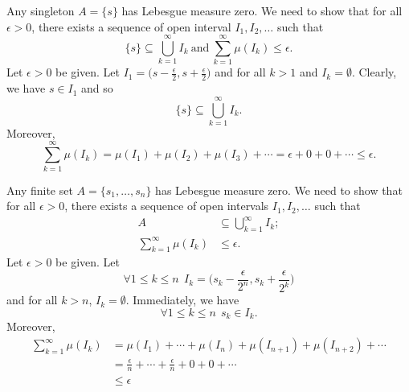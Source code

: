 \begin{eg}
    Any singleton \( A = \{ s  \}   \) has Lebesgue measure zero. We need to show that for all \( \epsilon > 0  \), there exists a sequence of open interval \( {I}_{1}, {I}_{2}, \dots  \) such that  
    \[  \{ s  \}  \subseteq  \bigcup_{ k=1  }^{ \infty }  {I}_{k } \ \text{and} \ \sum_{ k=1  }^{ \infty  } \mu ({I}_{k}) \leq \epsilon.    \]
    Let \( \epsilon > 0  \) be given. Let \( {I}_{1} = \Big(  s - \frac{ \epsilon }{ 2 }  , s + \frac{ \epsilon }{ 2 }  \Big) \) and for all \( k > 1  \) and \( {I}_{k } = \emptyset  \). Clearly, we have \( s \in {I}_{1} \) and so 
    \[  \{ s  \}  \subseteq  \bigcup_{ k=1  }^{ \infty  }  {I}_{k}. \]
    Moreover, 
    \[  \sum_{ k=1  }^{ \infty  } \mu({I}_{k}) = \mu({I}_{1}) + \mu({I}_{2}) + \mu({I}_{3}) + \cdots = \epsilon + 0 + 0 + \cdots \leq \epsilon. \]
\end{eg}

\begin{eg}
   Any finite set \( A = \{  {s}_{1}, \dots, {s}_{n} \}   \) has Lebesgue measure zero. We need to show that for all \( \epsilon > 0  \), there exists a sequence of open intervals \( {I}_{1}, {I}_{2}, \dots  \) such that  
   \begin{align*}
       A &\subseteq  \bigcup_{ k=1  }^{ \infty  }  {I}_{k}; \\
       \sum_{ k=1  }^{ \infty  } \mu({I}_{k}) &\leq \epsilon.
   \end{align*}
   Let \( \epsilon > 0  \) be given. Let 
   \[  \forall 1 \leq k \leq n \ \ {I}_{k } = \Big(  {s}_{k } - \frac{ \epsilon }{ 2^{n} }  , {s}_{k } + \frac{ \epsilon }{ 2^{k} }  \Big) \]
   and for all \(  k > n  \), \( {I}_{k } = \emptyset \). Immediately, we have 
   \[  \forall 1 \leq k \leq n \ \ {s}_{ k } \in {I}_{k }. \]
   Moreover,  
   \begin{align*}
   \sum_{ k=1  }^{ \infty  } \mu({I}_{k}) &= \mu({I}_{1}) + \cdots + \mu({I}_{n}) + \mu({I}_{n+1}) + \mu({I}_{n+2}) + \cdots    \\
                            &= \frac{ \epsilon }{ n }  + \cdots + \frac{ \epsilon }{ n }  + 0 + 0 + \cdots \\ 
                            &\leq \epsilon
   \end{align*}
\end{eg}


